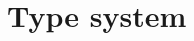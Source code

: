 \documentclass[a4paper,11pt]{article}
\theoremstyle{definition}
\begin{document}




\clearpage


\section{Type system}




% 



\end{document}
